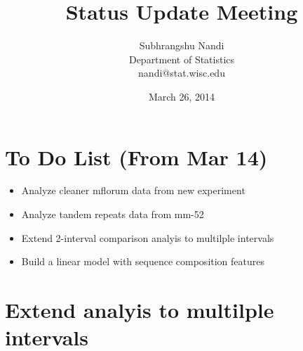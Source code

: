\documentclass[14pt]{article}
\begin{document}

\title{Status Update Meeting}
\author{Subhrangshu Nandi\\
  Department of Statistics\\
  nandi@stat.wisc.edu}
\date{March 26, 2014}
\maketitle

\section*{To Do List (From Mar 14)}
\begin{itemize}
\item
Analyze cleaner mflorum data from new experiment
\item
Analyze tandem repeats data from mm-52
\item
Extend 2-interval comparison analyis to multilple intervals
\item
Build a linear model with sequence composition features
\end{itemize}

\section*{Extend analyis to multilple intervals}
\end{document}
